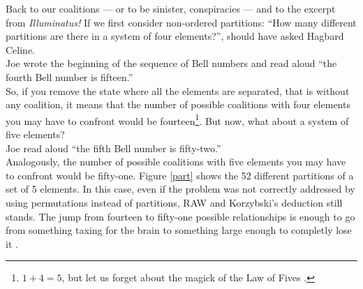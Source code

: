 Back to our coalitions --- or to be sinister, conspiracies --- and to the excerpt from \textit{Illuminatus!} If we first consider non-ordered partitions: ``How many different partitions are there in a system of four elements?'', should have asked Hagbard Celine.\\
Joe wrote the beginning of the sequence of Bell numbers and read aloud ``the fourth Bell number is fifteen.''\\
So, if you remove the state where all the elements are separated, that is without any coalition, it means that the number of possible coalitions with four elements you may have to confront would be fourteen\footnote{$1+4=5$, but let us forget about the magick of the Law of Fives \cite{Malaclypse1963}.}. But now, what about a system of five elements?\\
Joe read aloud ``the fifth Bell number is fifty-two.''\\
Analogously, the number of possible coalitions with five elements you may have to confront would be fifty-one. Figure \ref{part} shows the 52 different partitions of a set of 5 elements.
In this case, even if the problem was not correctly addressed by using permutations instead of partitions, RAW and Korzybski's deduction still stands. 
The jump from fourteen to fifty-one possible relationships is enough to go from something taxing for the brain to something large enough to completly lose it \cite{Kelly1955, Korzybski1933}. \\

